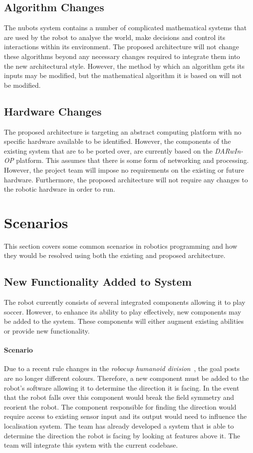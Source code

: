 \documentclass[english,12pt]{scrartcl}
\begin{document}
		\subsection{Algorithm Changes}
			The \gls{nubots} system contains a number of complicated mathematical systems that are used by the robot to analyse the world, make decisions and control its interactions within its environment. 
			The proposed architecture will not change these algorithms beyond any necessary changes required to integrate them into the new architectural style.
			However, the method by which an algorithm gets its inputs may be modified, but the mathematical algorithm it is based on will not be modified.
			
		\subsection{Hardware Changes}
			The proposed architecture is targeting an abstract computing platform with no specific hardware available to be identified.
			However, the components of the existing system that are to be ported over, are currently based on the \emph{DARwIn-OP} platform.
			This assumes that there is some form of networking and processing.
			However, the project team will impose no requirements on the existing or future hardware.
			Furthermore, the proposed architecture will not require any changes to the robotic hardware in order to run.

	\section{Scenarios}
		This section covers some common scenarios in robotics programming and how they would be resolved 
		using both the existing and proposed architecture.

		\subsection{New Functionality Added to System}
			The robot currently consists of several integrated components allowing it to play soccer.
			However, to enhance its ability to play effectively, new components may be added to the system.
			These components will either augment existing abilities or provide new functionality.

			\paragraph{Scenario} Due to a recent rule changes in the 
			\emph{\gls{robocup} humanoid division}~\cite[Section 1.2]{humanoid2013rules}, the goal posts are no longer different colours.
			Therefore, a new component must be added to the robot's software allowing it to determine the direction it is facing.
			In the event that the robot falls over this component would break the field symmetry and reorient the robot.
			The component responsible for finding the direction would require access to existing sensor input and its output would need to influence the localisation system.
			The team has already developed a system that is able to determine the direction the robot is facing by looking at features above it.
			The team will integrate this system with the current codebase.
\end{document}
